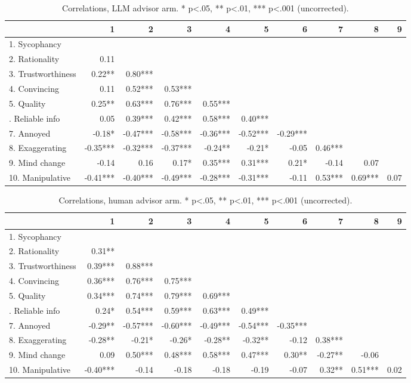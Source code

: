 \begin{table}

\caption{\label{tab:cor_llm}Correlations, LLM advisor arm. * p<.05, ** p<.01, *** p<.001 (uncorrected).}
\centering
\begin{tabular}[t]{lrrrrrrrrr}
\toprule
  & 1 & 2 & 3 & 4 & 5 & 6 & 7 & 8 & 9\\
\midrule
1. Sycophancy &  &  &  &  &  &  &  &  & \\
2. Rationality & 0.11 &  &  &  &  &  &  &  & \\
3. Trustworthiness & 0.22** & 0.80*** &  &  &  &  &  &  & \\
4. Convincing & 0.11 & 0.52*** & 0.53*** &  &  &  &  &  & \\
5. Quality & 0.25** & 0.63*** & 0.76*** & 0.55*** &  &  &  &  & \\
\addlinespace
6. Reliable info & 0.05 & 0.39*** & 0.42*** & 0.58*** & 0.40*** &  &  &  & \\
7. Annoyed & -0.18* & -0.47*** & -0.58*** & -0.36*** & -0.52*** & -0.29*** &  &  & \\
8. Exaggerating & -0.35*** & -0.32*** & -0.37*** & -0.24** & -0.21* & -0.05 & 0.46*** &  & \\
9. Mind change & -0.14 & 0.16 & 0.17* & 0.35*** & 0.31*** & 0.21* & -0.14 & 0.07 & \\
10. Manipulative & -0.41*** & -0.40*** & -0.49*** & -0.28*** & -0.31*** & -0.11 & 0.53*** & 0.69*** & 0.07\\
\bottomrule
\end{tabular}
\end{table}

\begin{table}

\caption{\label{tab:cor_human}Correlations, human advisor arm. * p<.05, ** p<.01, *** p<.001 (uncorrected).}
\centering
\begin{tabular}[t]{lrrrrrrrrr}
\toprule
  & 1 & 2 & 3 & 4 & 5 & 6 & 7 & 8 & 9\\
\midrule
1. Sycophancy &  &  &  &  &  &  &  &  & \\
2. Rationality & 0.31** &  &  &  &  &  &  &  & \\
3. Trustworthiness & 0.39*** & 0.88*** &  &  &  &  &  &  & \\
4. Convincing & 0.36*** & 0.76*** & 0.75*** &  &  &  &  &  & \\
5. Quality & 0.34*** & 0.74*** & 0.79*** & 0.69*** &  &  &  &  & \\
\addlinespace
6. Reliable info & 0.24* & 0.54*** & 0.59*** & 0.63*** & 0.49*** &  &  &  & \\
7. Annoyed & -0.29** & -0.57*** & -0.60*** & -0.49*** & -0.54*** & -0.35*** &  &  & \\
8. Exaggerating & -0.28** & -0.21* & -0.26* & -0.28** & -0.32** & -0.12 & 0.38*** &  & \\
9. Mind change & 0.09 & 0.50*** & 0.48*** & 0.58*** & 0.47*** & 0.30** & -0.27** & -0.06 & \\
10. Manipulative & -0.40*** & -0.14 & -0.18 & -0.18 & -0.19 & -0.07 & 0.32** & 0.51*** & 0.02\\
\bottomrule
\end{tabular}
\end{table}
